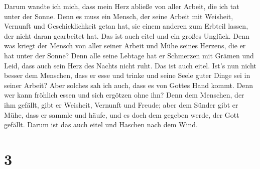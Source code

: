  Darum wandte ich mich, dass mein Herz abließe von aller
Arbeit, die ich tat unter der Sonne.  Denn es muss ein
Mensch, der seine Arbeit mit Weisheit, Vernunft und Geschicklichkeit
getan hat, sie einem anderen zum Erbteil lassen, der nicht daran
gearbeitet hat. Das ist auch eitel und ein großes Unglück.
 Denn was kriegt der Mensch von aller seiner Arbeit und
Mühe seines Herzens, die er hat unter der Sonne?  Denn
alle seine Lebtage hat er Schmerzen mit Grämen und Leid, dass auch sein
Herz des Nachts nicht ruht. Das ist auch eitel.  Ist's
nun nicht besser dem Menschen, dass er esse und trinke und seine Seele
guter Dinge sei in seiner Arbeit? Aber solches sah ich auch, dass es von
Gottes Hand kommt.  Denn wer kann fröhlich essen und sich
ergötzen ohne ihn?  Denn dem Menschen, der ihm gefällt,
gibt er Weisheit, Vernunft und Freude; aber dem Sünder gibt er Mühe,
dass er sammle und häufe, und es doch dem gegeben werde, der Gott
gefällt. Darum ist das auch eitel und Haschen nach dem Wind.

\hypertarget{section-2}{%
\section{3}\label{section-2}}


